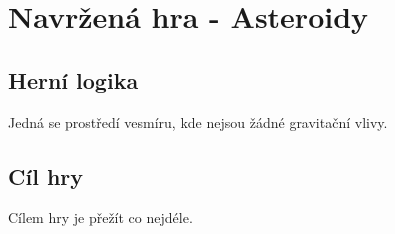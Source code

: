 \chapter{Navržená hra - Asteroidy}

\section{Herní logika}
Jedná se prostředí vesmíru, kde nejsou žádné gravitační vlivy.

\section{Cíl hry}
Cílem hry je přežít co nejdéle.





